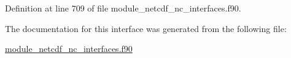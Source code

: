 Definition at line 709 of file module\+\_\+netcdf\+\_\+nc\+\_\+interfaces.\+f90.



The documentation for this interface was generated from the following file\+:\begin{DoxyCompactItemize}
\item 
\hyperlink{module__netcdf__nc__interfaces_8f90}{module\+\_\+netcdf\+\_\+nc\+\_\+interfaces.\+f90}\end{DoxyCompactItemize}
